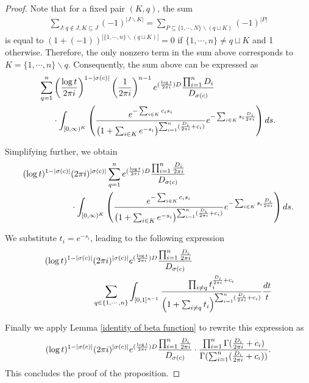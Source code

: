 \documentclass[10pt,a4paper]{amsart}
\begin{document}
\begin{proof}
\smallskip

Note that for a fixed pair $(K,q)$, the sum
\begin{align*}
	\sum_{J:q\not\in J,K\subseteq J}(-1)^{|J\backslash K|}=\sum_{P\subseteq\{1,\cdots, N\}\backslash(q\sqcup K)}(-1)^{|P|}
\end{align*}
is equal to $(1+(-1))^{|\{1,\cdots, n\}\backslash(q\sqcup K)|}=0$ if $\{1,\cdots, n\}\not=q\sqcup K$ and 1 otherwise. Therefore, the only nonzero term in the sum above corresponds to $K=\{1,\cdots,n\}\backslash q$. Consequently, the sum above can be expressed as
\begin{align*}
	\sum_{q=1}^n&\left(\frac{\log t}{2\pi{\rm i}}\right)^{1-|\sigma(c)|}\left(\frac{1}{2\pi {\rm i}}\right)^{n-1}e^{(\frac{\log t}{2\pi {\rm i}}) D}\frac{\prod_{i=1}^n D_i}{D_{\sigma(c)}}\\
	&\cdot\int_{[0,\infty)^K}\left(\frac{e^{-\sum_{i\in K}c_is_i}}{\left(1+\sum_{i\in K}e^{-s_i}\right)^{\sum_{i=1}^n(\frac{D_i}{2\pi{\rm i}}+c_i)}}e^{-\sum_{i\in K}s_i \frac{D_i}{2\pi{\rm i}}}\right)ds .
\end{align*}

\smallskip

Simplifying further, we obtain
\begin{align*}
	(\log t)^{1-|\sigma(c)|}&(2\pi {\rm i})^{|\sigma(c)|}\sum_{q=1}^n e^{(\frac{\log t}{2\pi {\rm i}}) D}\frac{\prod_{i=1}^n\frac{D_i}{2\pi{\rm i}}}{D_{\sigma(c)}}\\
	&\cdot\int_{[0,\infty)^K}\left(\frac{e^{-\sum_{i\in K}c_is_i}}{\left(1+\sum_{i\in K}e^{-s_i}\right)^{\sum_{i=1}^n(\frac{D_i}{2\pi{\rm i}}+c_i)}}e^{-\sum_{i\in K}s_i \frac{D_i}{2\pi{\rm i}}}\right)ds .
\end{align*}

\smallskip

We substitute $t_i=e^{-s_i}$, leading to the following expression
\begin{align*}
	(\log t)^{1-|\sigma(c)|}&(2\pi {\rm i})^{|\sigma(c)|}e^{(\frac{\log t}{2\pi {\rm i}}) D} \frac{\prod_{i=1}^n \frac{D_i}{2\pi {\rm i}}}{D_{\sigma(c)}}\\
	&\sum_{q\in\{1,\cdots, n\}}\int_{[0,1]^{n-1}}\frac{\prod_{i\not=q}t_i^{\frac{D_i}{2\pi{\rm i}}+c_i}}{\left(1+\sum_{i\not=q}t_i\right)^{\sum_{i=1}^n(\frac{D_i}{2\pi{\rm i}}+c_i)}}\frac{dt}{t}
\end{align*}

\smallskip


Finally we apply Lemma \ref{identity of beta function} to rewrite this expression as
\begin{align*}
	(\log t)^{1-|\sigma(c)|}(2\pi {\rm i})^{|\sigma(c)|}e^{(\frac{\log t}{2\pi {\rm i}}) D}\frac{\prod_{i=1}^n \frac{D_i}{2\pi{\rm i}}}{D_{\sigma(c)}}\cdot\frac{\prod_{i=1}^n\Gamma(\frac{D_i}{2\pi{\rm i}}+c_i)}{\Gamma(\sum_{i=1}^n(\frac{D_i}{2\pi{\rm i}}+c_i))} .
\end{align*}
This concludes the proof of the proposition.
\end{proof}
\end{document}
